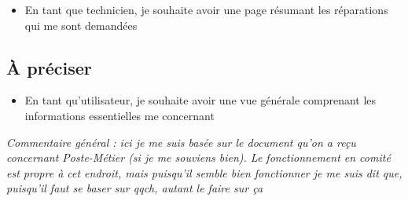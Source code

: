 \documentclass[a4paper, 11pt]{article}
\begin{document}
\begin{itemize}
  \item En tant que technicien, je souhaite avoir une page résumant les réparations qui me sont demandées
\end{itemize}

\subsection{À préciser}
\begin{itemize}
  \item En tant qu'utilisateur, je souhaite avoir une vue générale comprenant les informations essentielles me concernant
\end{itemize}

\emph{Commentaire général : ici je me suis basée sur le document qu'on a reçu concernant Poste-Métier (si je me souviens bien). Le fonctionnement en comité est propre à cet endroit, mais puisqu'il semble bien fonctionner je me suis dit que, puisqu'il faut se baser sur qqch, autant le faire sur ça}
\end{document}
